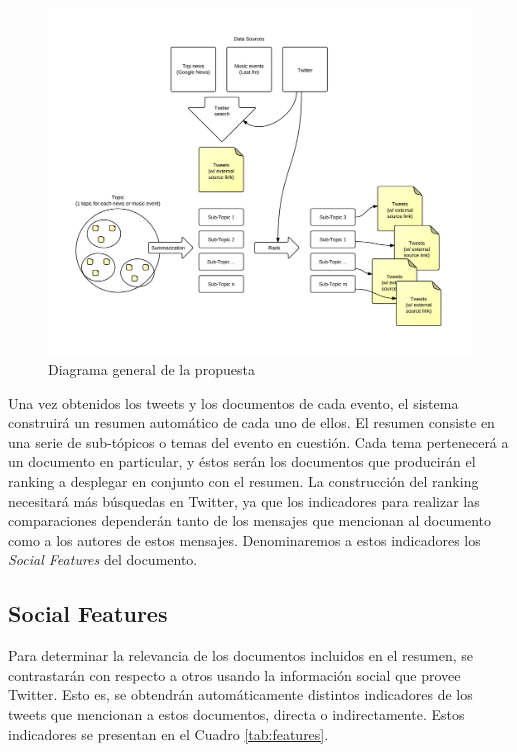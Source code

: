 \documentclass[11pt,letterpaper]{article}
\begin{document}
  \begin{figure}[htb]
\centering
\includegraphics[width=15cm]{./img/general.png}
\caption{\label{fig:general}Diagrama general de la propuesta}
\end{figure}

  Una vez obtenidos los tweets y los documentos de cada evento, el
  sistema construirá un resumen automático de cada uno de ellos. El
  resumen consiste en una serie de sub-tópicos o temas del evento en
  cuestión. Cada tema pertenecerá a un documento en particular, y éstos
  serán los documentos que producirán el ranking a desplegar en conjunto
  con el resumen. La construcción del ranking necesitará más búsquedas
  en Twitter, ya que los indicadores para realizar las comparaciones
  dependerán tanto de los mensajes que mencionan al documento como a los
  autores de estos mensajes. Denominaremos a estos indicadores los
  \emph{Social Features} del documento.


\subsection{Social Features}
\label{sec-3.1}


   Para determinar la relevancia de los documentos incluidos en el
   resumen, se contrastarán con respecto a otros usando la información
   social que provee Twitter. Esto es, se obtendrán automáticamente
   distintos indicadores de los tweets que mencionan a estos documentos\cite{barbara},
   directa o indirectamente. Estos indicadores se presentan en el
   Cuadro \ref{tab:features}.
\end{document}
